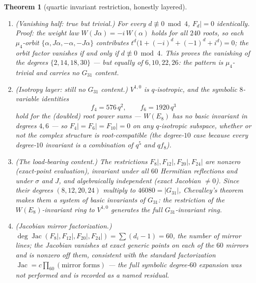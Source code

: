 \documentclass[11pt,a4paper]{article}
\newtheorem{theorem}{Theorem}
\theoremstyle{remark}
\DeclareMathOperator{\Jac}{Jac}
\begin{document}
\begin{theorem}[quartic invariant restriction, honestly layered]
\label{thm:quartic}
\begin{enumerate}
\item[(a)] \emph{(Vanishing half: true but trivial.)}  For every
$d\not\equiv0\bmod4$, $F_d|=0$ identically.  Proof: the weight law
$W(J\alpha)=-i\,W(\alpha)$ holds for all $240$ roots, so each
$\mu_4$-orbit $\{\alpha,J\alpha,-\alpha,-J\alpha\}$ contributes
$t^d\bigl(1+(-i)^d+(-1)^d+i^d\bigr)=0$; the orbit factor vanishes if
and only if $d\not\equiv0\bmod4$.  This proves the vanishing of the
degrees $\{2,14,18,30\}$ --- but equally of $6,10,22,26$: the pattern
is $\mu_4$-trivial and carries no $G_{31}$ content.
\item[(b)] \emph{(Isotropy layer: still no $G_{31}$ content.)}
$V^{1,0}$ is $q$-isotropic, and the symbolic $8$-variable identities
\[
f_4=576\,q^2,\qquad f_6=1920\,q^3
\]
hold for the (doubled) root power sums --- $W(E_8)$ has no basic
invariant in degrees $4,6$ --- so $F_4|=F_6|=F_{10}|=0$ on \emph{any}
$q$-isotropic subspace, whether or not the complex structure is
root-compatible (the degree-$10$ case because every degree-$10$
invariant is a combination of $q^5$ and $q f_8$).
\item[(c)] \emph{(The load-bearing content.)}  The restrictions
$F_8|,F_{12}|,F_{20}|,F_{24}|$ are nonzero (exact-point evaluation),
invariant under all $60$ Hermitian reflections and under
$\sigma$ and $J$, and \emph{algebraically independent} (exact Jacobian
$\neq0$).  Since their degrees $(8,12,20,24)$ multiply to
$46080=|G_{31}|$, Chevalley's theorem \cite{Che55,LT09} makes them a
system of \emph{basic invariants} of $G_{31}$: the restriction of the
$W(E_8)$-invariant ring to $V^{1,0}$ generates the full
$G_{31}$-invariant ring.
\item[(d)] \emph{(Jacobian mirror factorization.)}
$\deg\Jac(F_8|,F_{12}|,F_{20}|,F_{24}|)=\sum(d_i-1)=60$, the number
of mirror lines; the Jacobian vanishes at exact generic points on
each of the $60$ mirrors and is nonzero off them, consistent with the
standard factorization $\Jac=c\prod_{60}(\text{mirror forms})$
\cite[Ch.~9]{LT09} --- the full symbolic degree-$60$ expansion was
not performed and is recorded as a named residual.
\end{enumerate}
\end{theorem}
\end{document}
